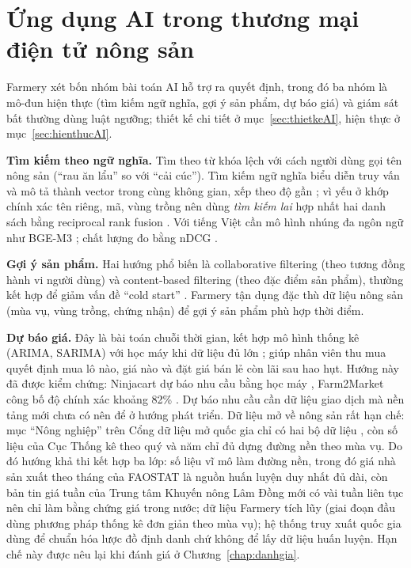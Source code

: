 \section{Ứng dụng AI trong thương mại điện tử nông sản}

Farmery xét bốn nhóm bài toán AI hỗ trợ ra quyết định, trong đó ba nhóm là mô-đun hiện thực (tìm kiếm ngữ nghĩa, gợi ý sản phẩm, dự báo giá) và giám sát bất thường dùng luật ngưỡng; thiết kế chi tiết ở mục~\ref{sec:thietkeAI}, hiện thực ở mục~\ref{sec:hienthucAI}.

\textbf{Tìm kiếm theo ngữ nghĩa.}\label{subsec:semanticsearch} Tìm theo từ khóa lệch với cách người dùng gọi tên nông sản (``rau ăn lẩu'' so với ``cải cúc''). Tìm kiếm ngữ nghĩa biểu diễn truy vấn và mô tả thành vector trong cùng không gian, xếp theo độ gần \parencite{reimers2019sbert}; vì yếu ở khớp chính xác tên riêng, mã, vùng trồng nên dùng \emph{tìm kiếm lai} hợp nhất hai danh sách bằng reciprocal rank fusion \parencite{cormack2009rrf}. Với tiếng Việt cần mô hình nhúng đa ngôn ngữ như BGE-M3 \parencite{chen2024bgem3}; chất lượng đo bằng nDCG \parencite{jarvelin2002ndcg}.

\textbf{Gợi ý sản phẩm.} Hai hướng phổ biến là collaborative filtering (theo tương đồng hành vi người dùng) và content-based filtering (theo đặc điểm sản phẩm), thường kết hợp để giảm vấn đề ``cold start'' \parencite{su2009collaborative}. Farmery tận dụng đặc thù dữ liệu nông sản (mùa vụ, vùng trồng, chứng nhận) để gợi ý sản phẩm phù hợp thời điểm.

\textbf{Dự báo giá.} Đây là bài toán chuỗi thời gian, kết hợp mô hình thống kê (ARIMA, SARIMA) với học máy khi dữ liệu đủ lớn \parencite{hyndman2021forecasting}; giúp nhân viên thu mua quyết định mua lô nào, giá nào và đặt giá bán lẻ còn lãi sau hao hụt. Hướng này đã được kiểm chứng: Ninjacart dự báo nhu cầu bằng học máy \parencite{ninjacart}, Farm2Market công bố độ chính xác khoảng 82\% \parencite{farm2market_2025}. Dự báo nhu cầu cần dữ liệu giao dịch mà nền tảng mới chưa có nên để ở hướng phát triển. Dữ liệu mở về nông sản rất hạn chế: mục ``Nông nghiệp'' trên Cổng dữ liệu mở quốc gia chỉ có hai bộ dữ liệu \parencite{opendata_govvn}, còn số liệu của Cục Thống kê theo quý và năm \parencite{cucthongke_nongnghiep} chỉ đủ dựng đường nền theo mùa vụ. Do đó \label{subsec:nguondulieunongsan}hướng khả thi kết hợp ba lớp: số liệu vĩ mô làm đường nền, trong đó giá nhà sản xuất theo tháng của FAOSTAT \parencite{faostat_producerprices} là nguồn huấn luyện duy nhất đủ dài, còn bản tin giá tuần của Trung tâm Khuyến nông Lâm Đồng \parencite{khuyennong_lamdong_gia} mới có vài tuần liên tục nên chỉ làm bằng chứng giá trong nước; dữ liệu Farmery tích lũy (giai đoạn đầu dùng phương pháp thống kê đơn giản theo mùa vụ); hệ thống truy xuất quốc gia dùng để chuẩn hóa lược đồ định danh chứ không để lấy dữ liệu huấn luyện. Hạn chế này được nêu lại khi đánh giá ở Chương~\ref{chap:danhgia}.

